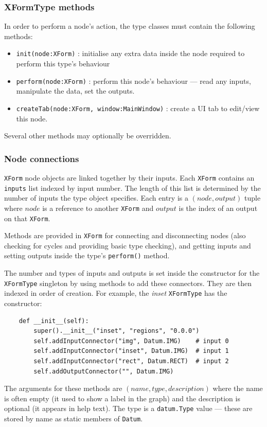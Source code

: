 \subsubsection{XFormType methods}
In order to perform a node's action, the type classes must contain
the following methods:
\begin{itemize}
\item \texttt{init(node:XForm)} : initialise any extra data inside
the node required to perform this type's behaviour
\item \texttt{perform(node:XForm)} : perform this node's behaviour ---
read any inputs, manipulate the data, set the outputs.
\item \texttt{createTab(node:XForm, window:MainWindow)} : create a UI tab to edit/view this node.
\end{itemize}
Several other methods may optionally be overridden.

\subsubsection{Node connections}
\label{linkage}
\texttt{XForm} node objects are linked together by their inputs.
Each \texttt{XForm} contains an \texttt{inputs} list indexed by
input number. The length of this list is determined by the number
of inputs the type object specifies. Each entry is a $(node,output)$
tuple where $node$ is a reference to another \texttt{XForm} and
$output$ is the index of an output on that \texttt{XForm}.

Methods are provided in \texttt{XForm} for connecting and disconnecting nodes
(also checking for cycles and providing basic type checking), and getting
inputs and setting outputs inside the type's \texttt{perform()} method.

The number and types of inputs and outputs is set inside the 
constructor for the \texttt{XFormType} singleton by using methods
to add these connectors. They are then indexed in order of creation.
For example, the \emph{inset} \texttt{XFormType} has the constructor:
\begin{lstlisting}
    def __init__(self):
        super().__init__("inset", "regions", "0.0.0")
        self.addInputConnector("img", Datum.IMG)    # input 0
        self.addInputConnector("inset", Datum.IMG)  # input 1
        self.addInputConnector("rect", Datum.RECT)  # input 2
        self.addOutputConnector("", Datum.IMG)
\end{lstlisting}
The arguments for these methods are $(name,type,description)$ where the name
is often empty (it used to show a label in the graph) and the description is
optional (it appears in help text). The type is a \texttt{datum.Type} value
--- these are stored by name as static members of \texttt{Datum}.

